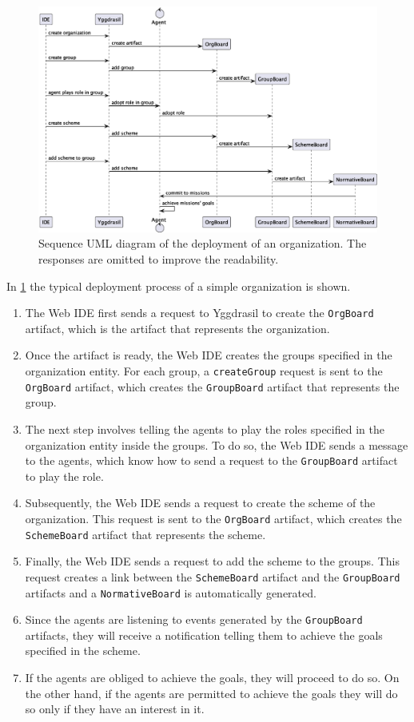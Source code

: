 \begin{figure}
    \centering
    \includegraphics[width=\textwidth]{images/uml/org-creation.eps}
    \caption{Sequence UML diagram of the deployment of an organization. The responses are omitted to improve the readability.}
    \label{fig:org-creation}
\end{figure}

In \cref{fig:org-creation} the typical deployment process of a simple organization is shown.
\begin{enumerate}
    \item The Web IDE first sends a request to Yggdrasil to create the \texttt{OrgBoard} artifact, which is the artifact that represents the organization.
    \item Once the artifact is ready, the Web IDE creates the groups specified in the organization entity.
    For each group, a \texttt{createGroup} request is sent to the \texttt{OrgBoard} artifact, which creates the \texttt{GroupBoard} artifact that represents the group.
    \item The next step involves telling the agents to play the roles specified in the organization entity inside the groups.
    To do so, the Web IDE sends a message to the agents, which know how to send a request to the \texttt{GroupBoard} artifact to play the role.
    \item Subsequently, the Web IDE sends a request to create the scheme of the organization.
    This request is sent to the \texttt{OrgBoard} artifact, which creates the \texttt{SchemeBoard} artifact that represents the scheme.
    \item Finally, the Web IDE sends a request to add the scheme to the groups.
    This request creates a link between the \texttt{SchemeBoard} artifact and the \texttt{GroupBoard} artifacts and a \texttt{NormativeBoard} is automatically generated.
    \item Since the agents are listening to events generated by the \texttt{GroupBoard} artifacts, they will receive a notification telling them to achieve the goals specified in the scheme.
    \item If the agents are obliged to achieve the goals, they will proceed to do so.
    On the other hand, if the agents are permitted to achieve the goals they will do so only if they have an interest in it.
\end{enumerate}

